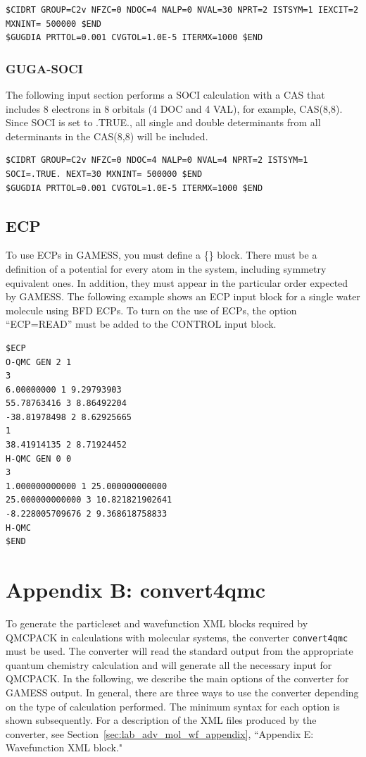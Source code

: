 {\begin{lstlisting}[style=GAMESS]
$CIDRT GROUP=C2v NFZC=0 NDOC=4 NALP=0 NVAL=30 NPRT=2 ISTSYM=1 IEXCIT=2 MXNINT= 500000 $END
$GUGDIA PRTTOL=0.001 CVGTOL=1.0E-5 ITERMX=1000 $END
\end{lstlisting}

\subsubsection{GUGA-SOCI}
The following input section performs a SOCI calculation with a CAS that includes 8
electrons in 8 orbitals (4 DOC and 4 VAL), for example, CAS(8,8). Since SOCI is set to .TRUE.,
all single and double determinants from all determinants in the CAS(8,8) will be included.

\begin{lstlisting}[style=GAMESS]
$CIDRT GROUP=C2v NFZC=0 NDOC=4 NALP=0 NVAL=4 NPRT=2 ISTSYM=1 SOCI=.TRUE. NEXT=30 MXNINT= 500000 $END
$GUGDIA PRTTOL=0.001 CVGTOL=1.0E-5 ITERMX=1000 $END
\end{lstlisting}


\subsection{ECP}
To use ECPs in GAMESS, you must define a \{\} 
block. There must be a definition of a potential for every atom in the system, including
symmetry equivalent ones. In addition, they must appear in the particular order expected
by GAMESS. The following example shows an ECP input block for a single water molecule using
BFD ECPs. To turn on the use of ECPs, the option “ECP=READ” must be added to the
CONTROL input block.

\begin{lstlisting}[style=GAMESS]
$ECP
O-QMC GEN 2 1
3
6.00000000 1 9.29793903
55.78763416 3 8.86492204
-38.81978498 2 8.62925665
1
38.41914135 2 8.71924452
H-QMC GEN 0 0
3
1.000000000000 1 25.000000000000
25.000000000000 3 10.821821902641
-8.228005709676 2 9.368618758833
H-QMC
$END
\end{lstlisting}


\newpage
\section{Appendix B: convert4qmc}\label{sec:lab_adv_mol_convert4qmc}
To generate the particleset and wavefunction XML blocks required by QMCPACK in
calculations with molecular systems, the converter \texttt{convert4qmc} must be used. The converter
will read the standard output from the appropriate quantum chemistry calculation and will
generate all the necessary input for QMCPACK. In the following, we describe the main options of the
converter for GAMESS output. In general, there are three ways to use the converter depending
on the type of calculation performed. The minimum syntax for each option is shown subsequently.
For a description of the XML files produced by the converter, see Section~\ref{sec:lab_adv_mol_wf_appendix}, ``Appendix E: Wavefunction XML block."

}
